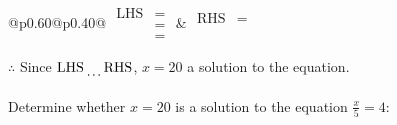 \documentclass[12pt]{article}
\newcounter{minipagecount}
\begin{document}
\begin{multicols}{2}
\begin{minipage}[t]{0.40\textwidth}
    \noindent
    \renewcommand{\arraystretch}{1.3} %
    \begin{tabular}{@{}p{0.60\linewidth}@{}p{0.40\linewidth}@{}}
        \(\begin{aligned}
            \text{LHS} &=  \\
                    &=  \\
                    &= 
        \end{aligned}\) &
        \(\begin{aligned}
            \text{RHS} &= \\
                    & \\
                    &
        \end{aligned}\)
    \end{tabular}
    \renewcommand{\arraystretch}{1.0} %
    \vspace{2pt}  %

    \noindent \(\therefore\) Since \(\text{LHS} \dotuline{\hspace{5mm}} \text{RHS}\), \(x = 20\) \dotuline{\hspace{12mm}} a solution to the equation.

\end{minipage}

\vspace*{0.5ex}
\vfill{}
\noindent{(\theminipagecount)}\hspace{0.1mm} %
\begin{minipage}[t]{0.40\textwidth} %

    \noindent Determine whether \(x = 20\) is a solution to the equation \(\frac{x}{5} = 4\):
    \vspace{2pt}  %


\end{minipage}
\end{multicols}
\end{document}
